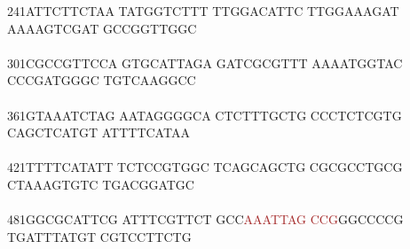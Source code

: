 \documentclass[11pt,twoside,reqno,a4paper]{article}
\begin{document}
{241\hspace*{1\charwidth}ATTCTTCTAA	TATGGTCTTT	TTGGACATTC	TTGGAAAGAT	AAAAGTCGAT	GCCGGTTGGC	\\
\hspace*{4\charwidth}\hspace*{1\charwidth}\hspace*{1\charwidth}\hspace*{1\charwidth}\hspace*{1\charwidth}\hspace*{1\charwidth}\hspace*{1\charwidth}\\
301\hspace*{1\charwidth}CGCCGTTCCA	GTGCATTAGA	GATCGCGTTT	AAAATGGTAC	CCCGATGGGC	TGTCAAGGCC	\\
\hspace*{4\charwidth}\hspace*{1\charwidth}\hspace*{1\charwidth}\hspace*{1\charwidth}\hspace*{1\charwidth}\hspace*{1\charwidth}\hspace*{1\charwidth}\\
361\hspace*{1\charwidth}GTAAATCTAG	AATAGGGGCA	CTCTTTGCTG	CCCTCTCGTG	CAGCTCATGT	ATTTTCATAA	\\
\hspace*{4\charwidth}\hspace*{1\charwidth}\hspace*{1\charwidth}\hspace*{1\charwidth}\hspace*{1\charwidth}\hspace*{1\charwidth}\hspace*{1\charwidth}\\
421\hspace*{1\charwidth}TTTTCATATT	TCTCCGTGGC	TCAGCAGCTG	CGCGCCTGCG	CTAAAGTGTC	TGACGGATGC	\\
\hspace*{4\charwidth}\hspace*{1\charwidth}\hspace*{1\charwidth}\hspace*{1\charwidth}\hspace*{1\charwidth}\hspace*{1\charwidth}\hspace*{1\charwidth}\\
481\hspace*{1\charwidth}GGCGCATTCG	ATTTCGTTCT	GCC\textcolor{Brown}{A}\textcolor{Brown}{A}\textcolor{Brown}{A}\textcolor{Brown}{T}\textcolor{Brown}{T}\textcolor{Brown}{A}\textcolor{Brown}{G}	\textcolor{Brown}{C}\textcolor{Brown}{C}\textcolor{Brown}{G}GGCCCCG	TGATTTATGT	CGTCCTTCTG	\\
}
\end{document}
